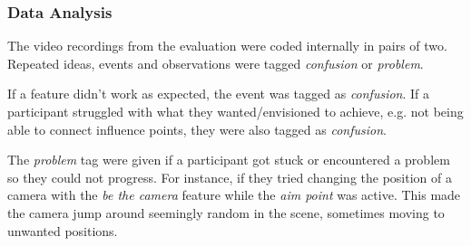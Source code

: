\subsubsection{Data Analysis}
The video recordings from the evaluation were coded internally in pairs of two. Repeated ideas, events and observations were tagged \textit{confusion} or \textit{problem}.

If a feature didn't work as expected, the event was tagged as \textit{confusion}. If a participant struggled with what they wanted/envisioned to achieve, e.g. not being able to connect influence points, they were also tagged as \textit{confusion}.

The \textit{problem} tag were given if a participant got stuck or encountered a problem so they could not progress. For instance, if they tried changing the position of a camera with the \textit{be the camera} feature while the \textit{aim point} was active. This made the camera jump around seemingly random in the scene, sometimes moving to unwanted positions.

